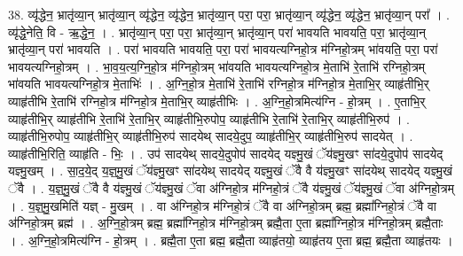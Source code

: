 \documentclass[17pt]{extarticle}
\begin{document}
38. व्यृ॑द्धेन॒ भ्रातृ॑व्या॒न् भ्रातृ॑व्या॒न् व्यृ॑द्धेन॒ व्यृ॑द्धेन॒ भ्रातृ॑व्या॒न् परा॒ परा॒ भ्रातृ॑व्या॒न् व्यृ॑द्धेन॒ व्यृ॑द्धेन॒ भ्रातृ॑व्या॒न् परा᳚ । . व्यृ॑द्धे॒नेति॒ वि - ऋ॒द्धे॒न॒ । . भ्रातृ॑व्या॒न् परा॒ परा॒ भ्रातृ॑व्या॒न् भ्रातृ॑व्या॒न् परा॑ भावयति भावयति॒ परा॒ भ्रातृ॑व्या॒न् भ्रातृ॑व्या॒न् परा॑ भावयति । . परा॑ भावयति भावयति॒ परा॒ परा॑ भावयत्यग्निहो॒त्र म॑ग्निहो॒त्रम् भा॑वयति॒ परा॒ परा॑ भावयत्यग्निहो॒त्रम् । . भा॒व॒य॒त्य॒ग्नि॒हो॒त्र म॑ग्निहो॒त्रम् भा॑वयति भावयत्यग्निहो॒त्र मे॒ताभि॑ रे॒ताभि॑ रग्निहो॒त्रम् भा॑वयति भावयत्यग्निहो॒त्र मे॒ताभिः॑ । . अ॒ग्नि॒हो॒त्र मे॒ताभि॑ रे॒ताभि॑ रग्निहो॒त्र म॑ग्निहो॒त्र मे॒ताभि॒र् व्याहृ॑तीभि॒र् व्याहृ॑तीभि रे॒ताभि॑ रग्निहो॒त्र म॑ग्निहो॒त्र मे॒ताभि॒र् व्याहृ॑तीभिः । . अ॒ग्नि॒हो॒त्रमित्य॑ग्नि - हो॒त्रम् । . ए॒ताभि॒र् व्याहृ॑तीभि॒र् व्याहृ॑तीभि रे॒ताभि॑ रे॒ताभि॒र् व्याहृ॑तीभि॒रुपोप॒ व्याहृ॑तीभि रे॒ताभि॑ रे॒ताभि॒र् व्याहृ॑तीभि॒रुप॑ । . व्याहृ॑तीभि॒रुपोप॒ व्याहृ॑तीभि॒र् व्याहृ॑तीभि॒रुप॑ सादयेथ् सादये॒दुप॒ व्याहृ॑तीभि॒र् व्याहृ॑तीभि॒रुप॑ सादयेत् । . व्याहृ॑तीभि॒रिति॒ व्याहृ॑ति - भिः॒ । . उप॑ सादयेथ् सादये॒दुपोप॑ सादयेद् यज्ञ्मु॒खं ॅय॑ज्ञ्मु॒खꣳ सा॑दये॒दुपोप॑ सादयेद् यज्ञ्मु॒खम् । . सा॒द॒ये॒द् य॒ज्ञ्॒मु॒खं ॅय॑ज्ञ्मु॒खꣳ सा॑दयेथ् सादयेद् यज्ञ्मु॒खं ॅवै वै य॑ज्ञ्मु॒खꣳ सा॑दयेथ् सादयेद् यज्ञ्मु॒खं ॅवै । . य॒ज्ञ्॒मु॒खं ॅवै वै य॑ज्ञ्मु॒खं ॅय॑ज्ञ्मु॒खं ॅवा अ॑ग्निहो॒त्र म॑ग्निहो॒त्रं ॅवै य॑ज्ञ्मु॒खं ॅय॑ज्ञ्मु॒खं ॅवा अ॑ग्निहो॒त्रम् । . य॒ज्ञ्॒मु॒खमिति॑ यज्ञ् - मु॒खम् । . वा अ॑ग्निहो॒त्र म॑ग्निहो॒त्रं ॅवै वा अ॑ग्निहो॒त्रम् ब्रह्म॒ ब्रह्मा᳚ग्निहो॒त्रं ॅवै वा अ॑ग्निहो॒त्रम् ब्रह्म॑ । . अ॒ग्नि॒हो॒त्रम् ब्रह्म॒ ब्रह्मा᳚ग्निहो॒त्र म॑ग्निहो॒त्रम् ब्रह्मै॒ता ए॒ता ब्रह्मा᳚ग्निहो॒त्र म॑ग्निहो॒त्रम् ब्रह्मै॒ताः । . अ॒ग्नि॒हो॒त्रमित्य॑ग्नि - हो॒त्रम् । . ब्रह्मै॒ता ए॒ता ब्रह्म॒ ब्रह्मै॒ता व्याहृ॑तयो॒ व्याहृ॑तय ए॒ता ब्रह्म॒ ब्रह्मै॒ता व्याहृ॑तयः । \newline
\end{document}
